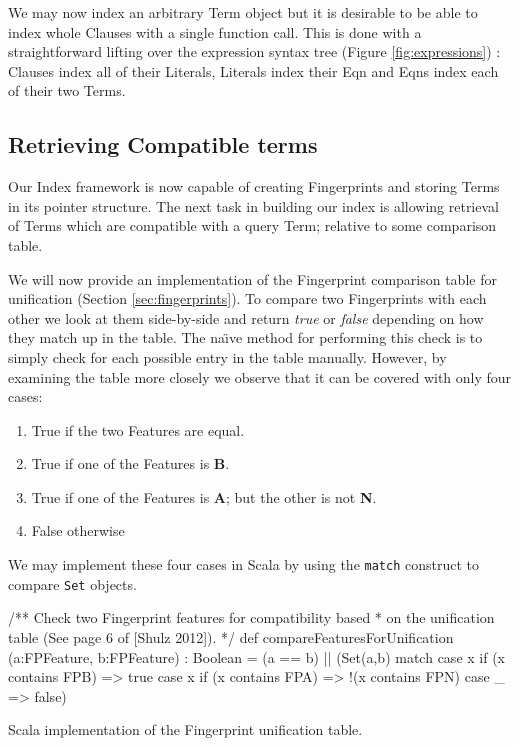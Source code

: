We may now index an arbitrary Term object but it is desirable to be able to index
whole Clauses with a single function call. This is done with a straightforward lifting
over the expression syntax tree (Figure \ref{fig:expressions}) : Clauses index all of their Literals, Literals index
their Eqn and Eqns index each of their two Terms.

\subsection{Retrieving Compatible terms}
\label{sec:retrieve}

Our Index framework is now capable of creating Fingerprints and storing Terms in
its pointer structure. The next task in building our index is allowing retrieval
of Terms which are compatible with a query Term; relative to some comparison
table.

We will now provide an implementation of the Fingerprint comparison table for unification (Section \ref{sec:fingerprints}).
To compare two Fingerprints with each other we look at them side-by-side and return
\emph{true} or \emph{false} depending on how they match up in the table.
The na\"{\i}ve method for performing this check is to simply check for each possible
entry in the table manually. However, by examining the table more closely we observe
that it can be covered with only four cases:
\begin{enumerate}
\item True if the two Features are equal.
\item True if one of the Features is \textbf{B}.
\item True if one of the Features is \textbf{A}; but the other is not \textbf{N}.
\item False otherwise 
\end{enumerate}
We may implement these four cases in Scala by using the \verb!match! construct
to compare \verb!Set! objects.
\begin{listing}[H]
\begin{scalacode}
 /** Check two Fingerprint features for compatibility based
   * on the unification table (See page 6 of [Shulz 2012]). */
  def compareFeaturesForUnification
         (a:FPFeature, b:FPFeature) : Boolean =
  (a == b) || 
  (Set(a,b) match {
    case x if (x contains FPB) => true
    case x if (x contains FPA) => !(x contains FPN)
    case _ => false})
\end{scalacode}
\caption{Scala implementation of the Fingerprint unification table. \protect\cite[p6]{shulz12}}
\label{lst:unitable}
\end{listing}


